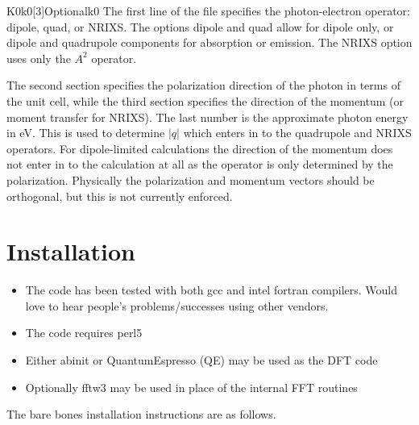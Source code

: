 \documentclass[11pt]{report}
\begin{document}
\begin{Card}{K0}{k0[3]}{Optional}{k0}
The first line of the  file specifies the photon-electron operator: dipole, quad, or NRIXS. The options dipole 
and quad allow for dipole only, or dipole and quadrupole components for absorption or emission. The NRIXS option uses only the $A^2$ 
operator. 

The second section specifies the polarization direction of the photon in terms of the unit cell, while the third section specifies the 
direction of the momentum (or moment transfer for NRIXS). The last number is the approximate photon energy in eV. This is used 
to determine $\vert q \vert$ which enters in to the quadrupole and NRIXS operators. For dipole-limited calculations the direction of the 
momentum does not enter in to the calculation at all as the operator is only determined by the polarization. 
Physically the polarization and momentum vectors should be orthogonal, but this is not currently enforced. 
\fi

\appendix
\chapter{Installation}
\begin{itemize}
\item The code has been tested with both gcc and intel fortran compilers. Would love to hear people's problems/successes using other vendors. 
\item The code requires perl5
\item Either {\sc abinit} or {\sc QuantumEspresso} (QE) may be used as the DFT code
\item Optionally {\sc fftw3} may be used in place of the internal FFT routines
\end{itemize}

The bare bones installation instructions are as follows.


\end{Card}
\end{document}
